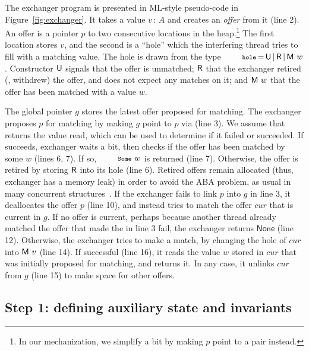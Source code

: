 The exchanger program is presented in ML-style pseudo-code in
Figure~\ref{fig:exchanger}. It takes a value $v\,{:}\,A$ and creates
an \emph{offer} from it (line 2). An offer is a pointer $p$ to two
consecutive locations in the heap.\footnote{In our mechanization, we
  simplify a bit by making $p$ point to a pair instead.}
%
The first location stores $v$, and the second is a ``hole'' which the
interfering thread tries to fill with a matching value. The hole is
drawn from the type
$\esc{hole}\,{=}\,\Unmatched\,{\mid}\,\Retired\,{\mid}\,\Matched
w$. Constructor ${\mathsf{U}}$ signals that the offer is unmatched;
${\mathsf{R}}$ that the exchanger retired (\ie, withdrew) the offer, and
does not expect any matches on it; and ${\mathsf{M}\ w}$ that the offer has
been matched with a value $w$.

The global pointer $g$ stores the latest offer proposed for
matching. The exchanger proposes $p$ for matching by making $g$ point
to $p$ via  (line 3). We assume that  returns the
value read, which can be used to determine if it failed or
succeeded. If  succeeds, exchanger waits a bit, then checks
if the offer has been matched by some $w$ (lines 6, 7). If so,
$\esc{Some}\ w$ is returned (line 7). Otherwise, the offer is retired
by storing ${\mathsf{R}}$ into its hole (line 6). Retired offers remain
allocated (thus, exchanger has a memory leak) in order to avoid the
ABA problem, as usual in many concurrent
structures~\cite{Herlihy-Shavit:08,Treiber:TR}.
%
If the exchanger fails to link $p$ into $g$ in line 3, it deallocates
the offer $p$ (line 10), and instead tries to match the offer $cur$
that is current in $g$. If no offer is current, perhaps because
another thread already matched the offer that made the  in
line 3 fail, the exchanger returns $\mathsf{None}$ (line
12). Otherwise, the exchanger tries to make a match, by changing the
hole of $cur$ into ${\mathsf{M}\ v}$ (line 14). If successful (line 16), it
reads the value $w$ stored in $cur$ that was initially proposed for
matching, and returns it. In any case, it unlinks $cur$ from $g$ (line
15) to make space for other offers.

\subsection{Step 1: defining auxiliary state and invariants}

